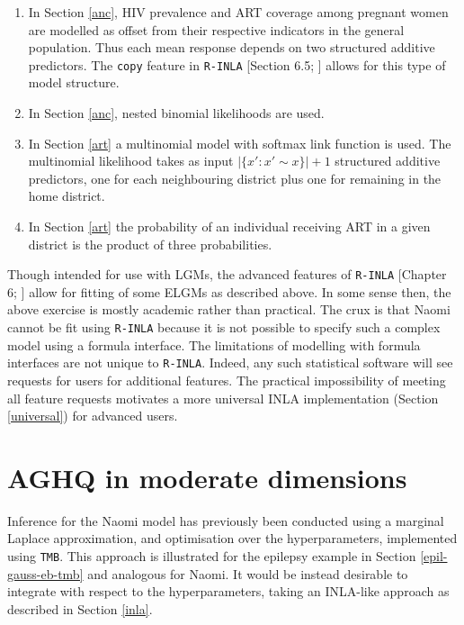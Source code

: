 \documentclass[a4paper, nobind]{templates/ociamthesis}
\begin{document}
\begin{enumerate}
\item
  In Section \ref{anc}, HIV prevalence and ART coverage among pregnant women are modelled as offset from their respective indicators in the general population.
  Thus each mean response depends on two structured additive predictors.
  The \texttt{copy} feature in \texttt{R-INLA} {[}Section 6.5; \textcite{gomez2020bayesian}{]} allows for this type of model structure.
\item
  In Section \ref{anc}, nested binomial likelihoods are used.
\item
  In Section \ref{art} a multinomial model with softmax link function is used.
  The multinomial likelihood takes as input \(|\{x': x' \sim x\}| + 1\) structured additive predictors, one for each neighbouring district plus one for remaining in the home district.
\item
  In Section \ref{art} the probability of an individual receiving ART in a given district is the product of three probabilities.
\end{enumerate}

Though intended for use with LGMs, the advanced features of \texttt{R-INLA} {[}Chapter 6; \textcite{gomez2020bayesian}{]} allow for fitting of some ELGMs as described above.
In some sense then, the above exercise is mostly academic rather than practical.
The crux is that Naomi cannot be fit using \texttt{R-INLA} because it is not possible to specify such a complex model using a formula interface.
The limitations of modelling with formula interfaces are not unique to \texttt{R-INLA}.
Indeed, any such statistical software will see requests for users for additional features.
The practical impossibility of meeting all feature requests motivates a more universal INLA implementation (Section \ref{universal}) for advanced users.

\hypertarget{pca-aghq}{%
\section{AGHQ in moderate dimensions}\label{pca-aghq}}

Inference for the Naomi model has previously been conducted using a marginal Laplace approximation, and optimisation over the hyperparameters, implemented using \texttt{TMB}.
This approach is illustrated for the epilepsy example in Section \ref{epil-gauss-eb-tmb} and analogous for Naomi.
It would be instead desirable to integrate with respect to the hyperparameters, taking an INLA-like approach as described in Section \ref{inla}.
\end{document}
